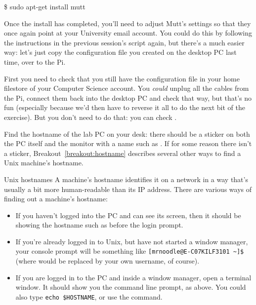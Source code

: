 \begin{ttoutenv}
\$ sudo apt-get install mutt
\end{ttoutenv}

Once the install has completed, you'll need to adjust Mutt's settings
so that they once again point at your University email account. You
could do this by following the instructions in the previous session's
script again, but there's a much easier way: let's just copy the
configuration file you created on the desktop PC last time, over to
the Pi.

First you need to check that you still have the 
configuration file in your home filestore of your Computer Science
account. You \textit{could} unplug all the cables from the Pi, connect
them back into the desktop PC and check that way, but that's no fun
(especially because we'd then have to reverse it all to do the next
bit of the exercise). But you don't need to do that: you can check
.

Find the hostname of the lab PC on your desk: there should be a
sticker on both the PC itself and the monitor with a name such as
. If for some reason there isn't a sticker,
Breakout~\ref{breakout:hostname} describes several other ways to find
a Unix machine's hostname.

\begin{linux}{Unix hostnames}
\label{breakout:hostname}
A machine's hostname identifies it on a network in a way that's usually a bit more human-readable than its IP address. There are various ways of finding out a machine's hostname:

\begin{itemize}
\item If you haven't logged into the PC and can see its screen, then it should be showing the hostname such as  before the login prompt.
\item If you're already logged in to Unix, but have not started a window manager, your console prompt will be something like  \verb|[mrnoodle@E-C07KILF3101 ~]$| (where  would be replaced by your own username, of course).
\item If you are logged in to the PC and inside a window manager, open a terminal window. It should show you the command line prompt, as above. You could also type \verb|echo $HOSTNAME|, or use the  command.
\end{itemize}
\end{linux}

